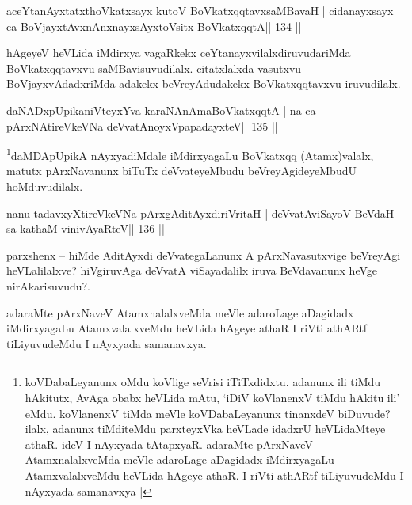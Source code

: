 \begin{shl}
aceYtanAyxtatxthoVkatxsayx kutoV BoVkatxqqtavxsaMBavaH |
cidanayxsayx ca BoVjayxtAvxnAnxnayxsAyxtoV\s sitx BoVkatxqqtA\hfill || 134 ||
\end{shl}

\begin{artha}
hAgeyeV heVLida iMdirxya vagaRkekx ceYtanayxvilalxdiruvudariMda  BoVkatxqqtavxvu saMBavisuvudilalx. citatxlalxda vasutxvu BoVjayxvAdadxriMda adakekx beVreyAdudakekx BoVkatxqqtavxvu iruvudilalx.
\end{artha}

\begin{shl}
daNADxpUpikaniVteyxYva karaNAnAmaBoVkatxqqtA |
na ca pArxNAtireVkeVNa deVvatA\s noyxVpapadayxteV\hfill || 135 ||
\end{shl}

\begin{artha}
\footnote{koVDabaLeyanunx oMdu koVlige seVrisi iTiTxdidxtu. adanunx ili  tiMdu hAkitutx, AvAga obabx heVLida mAtu, `iDiV koVlanenxV tiMdu hAkitu  ili' eMdu. koVlanenxV tiMda meVle koVDabaLeyanunx tinanxdeV biDuvude?  ilalx, adanunx tiMditeMdu parxteyxVka heVLade idadxrU heVLidaMteye athaR. ideV I nAyxyada tAtapxyaR. adaraMte pArxNaveV AtamxnalalxveMda meVle adaroLage aDagidadx  iMdirxyagaLu AtamxvalalxveMdu heVLida hAgeye athaR. I riVti athARtf tiLiyuvudeMdu I nAyxyada samanavxya |}daMDApUpikA nAyxyadiMdale iMdirxyagaLu BoVkatxqq (Atamx)valalx, matutx pArxNavanunx biTuTx deVvateyeMbudu beVreyAgideyeMbudU hoMduvudilalx.
\end{artha}


\begin{shl}
nanu tadavxyXtireVkeVNa pArxgAditAyxdiriVritaH |
deVvatAviSayoV BeVdaH sa kathaM vinivAyaRteV\hfill || 136 ||
\end{shl}

\begin{artha}
parxshenx -- hiMde AditAyxdi deVvategaLanunx A pArxNavasutxvige beVreyAgi heVLalilalxve? hiVgiruvAga deVvatA viSayadalilx iruva BeVdavanunx heVge nirAkarisuvudu?.

adaraMte pArxNaveV AtamxnalalxveMda meVle adaroLage aDagidadx iMdirxyagaLu AtamxvalalxveMdu heVLida hAgeye athaR I riVti athARtf tiLiyuvudeMdu I nAyxyada samanavxya. 
\end{artha}





